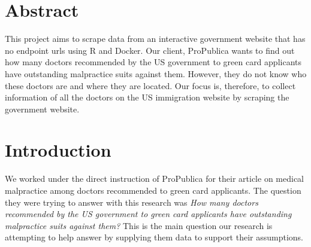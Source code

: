 \documentclass[10pt,letterpaper]{article}
\newcommand{\getIndex}[2]{
  \ForEach{,}{\IfEq{#1}{\thislevelitem}{\number\thislevelcount\ExitForEach}{}}{#2}
}
\newcommand{\getAff}[1]{
  \getIndex{#1}{}
}
\begin{document}
\vspace*{0.2in}

\section*{Abstract}
This project aims to scrape data from an interactive government website
that has no endpoint urls using R and Docker. Our client, ProPublica
wants to find out how many doctors recommended by the US government to
green card applicants have outstanding malpractice suits against them.
However, they do not know who these doctors are and where they are
located. Our focus is, therefore, to collect information of all the
doctors on the US immigration website by scraping the government
website.


\linenumbers

\section{Introduction}\label{introduction}

We worked under the direct instruction of ProPublica for their article
on medical malpractice among doctors recommended to green card
applicants. The question they were trying to answer with this research
was \emph{How many doctors recommended by the US government to green
card applicants have outstanding malpractice suits against them?} This
is the main question our research is attempting to help answer by
supplying them data to support their assumptions.
\end{document}
